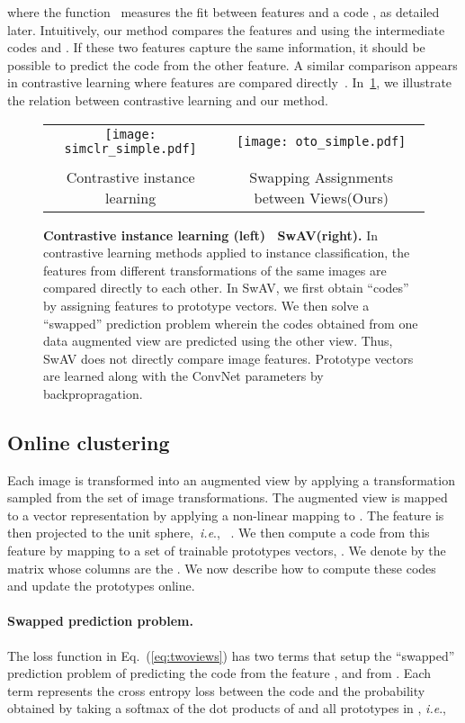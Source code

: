 \documentclass{article}
\def\onedot{.}
\def\ie{\emph{i.e}\onedot} \def\Ie{\emph{I.e}\onedot}
\def\OURS{SwAV\xspace}
\def\OURSFULL{Swapping Assignments between Views\xspace}
\begin{document}
where the function~ measures the fit between features  and a code , as detailed later.  
Intuitively, our method compares the features  and  using the intermediate codes  and . 
If these two features capture the same information, it should be possible to predict the code from the other feature.
A similar comparison appears in contrastive learning where features are compared directly~\cite{wu2018unsupervised}. 
In~\cref{fig:oto}, we illustrate the relation between contrastive learning and our method.



\begin{figure}[t]
\centering
\begin{tabular}{c | c}
\texttt{[image: simclr\_simple.pdf]} &
\texttt{[image: oto\_simple.pdf]} \\
\\
Contrastive instance learning & \OURSFULL (Ours)
\end{tabular}
   \caption{\textbf{Contrastive instance learning (left) \vs\ \OURS (right).}
In contrastive learning methods applied to instance classification, the features from different transformations of the same images are compared directly to each other.
In \OURS, we first obtain ``codes'' by assigning features to prototype vectors.
We then solve a ``swapped'' prediction problem wherein the codes obtained from one data augmented view are predicted using the other view.
Thus, \OURS does not directly compare image features.
Prototype vectors are learned along with the ConvNet parameters by backpropragation. 
}\label{fig:oto}
\end{figure}

\subsection{Online clustering}
\label{sec:proto}

Each image  is transformed into an augmented view  by applying a transformation  sampled from the set  of image transformations.
The augmented view is mapped to a vector representation by applying a non-linear mapping  to .
The feature is then projected to the unit sphere,~\ie,~ .
We then compute a code  from this feature by mapping  to a set of  trainable prototypes vectors,  .
We denote by  the matrix whose columns are the . 
We now describe how to compute these codes and update the prototypes online.

\paragraph{Swapped prediction problem.} 
The loss function in Eq.~(\ref{eq:twoviews}) has two terms that setup the ``swapped'' prediction problem of predicting the code  from the feature , and  from . 
Each term represents the cross entropy loss between the code and the probability obtained by taking a softmax of the dot products of  and all prototypes in , \ie, 
\end{document}
